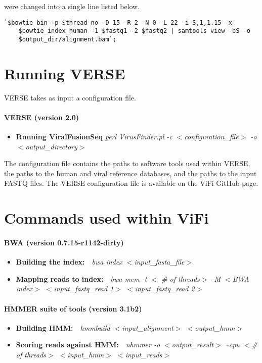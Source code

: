 \documentclass[12pt]{article}
\begin{document}
were changed into a single line listed below.

\begin{lstlisting}[basicstyle=\footnotesize]
    `$bowtie_bin -p $thread_no -D 15 -R 2 -N 0 -L 22 -i S,1,1.15 -x 
    $bowtie_index_human -1 $fastq1 -2 $fastq2 | samtools view -bS -o 
    $output_dir/alignment.bam`;
\end{lstlisting}

\section{Running VERSE}\label{verse_commands}
VERSE takes as input a configuration file.  

\paragraph{\textbf{VERSE (version 2.0)}}
\begin{itemize}
\item{\textbf{Running ViralFusionSeq}} \emph{perl VirusFinder.pl -c $<$configuration\_file$>$ -o $<$output\_directory$>$}
\end{itemize}

The configuration file contains the paths to software tools used within VERSE, the paths to the human and viral reference databases, and the paths to the input FASTQ files.  The VERSE configuration file is available on the ViFi GitHub page.


\section{Commands used within ViFi}\label{commands}
\paragraph{\textbf{BWA (version 0.7.15-r1142-dirty)~\cite{Li2009}}}
\begin{itemize}
\item \textbf{Building the index:}~~\emph{bwa index $<$input\_fasta\_file$>$}
\item \textbf{Mapping reads to index:}~~\emph{bwa mem -t $<$ \# of threads$>$ -M $<$BWA index$>$  $<$input\_fastq\_read 1$>$ $<$input\_fastq\_read 2$>$}
\end{itemize}

\paragraph{\textbf{HMMER suite of tools (version 3.1b2)}~\cite{Eddy1998}}
\begin{itemize}
\item \textbf{Building HMM:}~~\emph{hmmbuild $<$input\_alignment$>$ $<$output\_hmm$>$}
\item \textbf{Scoring reads against HMM:}~~\emph{nhmmer -o $<$output\_result$>$ --cpu $<$\# of threads$>$ $<$input\_hmm$>$ $<$input\_reads$>$}
\end{itemize}
\end{document}
